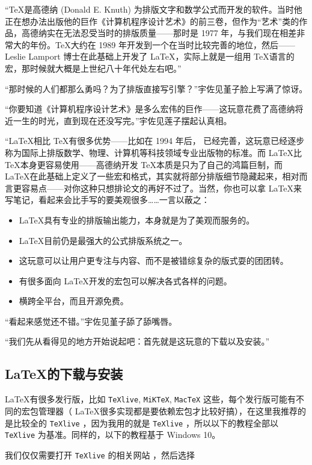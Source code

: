 “\TeX 是高德纳 (Donald E. Knuth) 为排版文字和数学公式而开发的软件。当时他正在想办法出版他的巨作《计算机程序设计艺术》的前三卷，但作为“艺术”类的作品，高德纳实在无法忍受当时的排版质量——那时是 1977 年，与我们现在相差非常大的年份。\TeX 大约在 1989 年开发到一个在当时比较完善的地位，然后—— Leslie Lamport 博士在此基础上开发了 \LaTeX，实际上就是一组用 \TeX 语言的宏，那时候就大概是上世纪八十年代处左右吧。”

“那时候的人们都那么勇吗？为了排版直接写引擎？”宇佐见堇子脸上写满了惊讶。

“你要知道《计算机程序设计艺术》是多么宏伟的巨作——这玩意花费了高德纳将近一生的时光，直到现在还没写完。”宇佐见莲子摆起认真相。

“\LaTeX 相比 \TeX 有很多优势——比如在 1994 年后，\LaTeXe{} 已经完善，这玩意已经逐步称为国际上排版数学、物理、计算机等科技领域专业出版物的标准。而 \LaTeX 比 \TeX 本身更容易使用——高德纳开发 \TeX 本质是只为了自己的鸿篇巨制，而 \LaTeX 在此基础上定义了一些宏和格式，其实就将部分排版细节隐藏起来，相对而言更容易点——对你这种只想排论文的再好不过了。当然，你也可以拿 \LaTeX 来写笔记，看起来会比手写的要美观很多……一言以蔽之：


\begin{itemize}
    \item \LaTeX 具有专业的排版输出能力，本身就是为了美观而服务的。
    \item \LaTeX 目前仍是最强大的公式排版系统之一。
    \item 这玩意可以让用户更专注与内容、而不是被错综复杂的版式耍的团团转。
    \item 有很多面向 \LaTeX 开发的宏包可以解决各式各样的问题。
    \item 横跨全平台，而且开源免费。
\end{itemize}

“看起来感觉还不错。”宇佐见堇子舔了舔嘴唇。

“我们先从看得见的地方开始说起吧：首先就是这玩意的下载以及安装。”

\subsection{\LaTeX 的下载与安装}

\LaTeX 有很多发行版，比如 \verb"TeXlive", \verb"MiKTeX", \verb"MacTeX" 这些，每个发行版可能有不同的宏包管理器（ \LaTeX 很多实现都是要依赖宏包才比较好搞），在这里我推荐的是比较全的 \verb"TeXlive" ，因为我用的就是 \verb"TeXlive" ，所以以下的教程全部以 \verb"TeXlive" 为基准。同样的，以下的教程基于 Windows 10。

我们仅仅需要打开 \verb"TeXlive" 的相关网站 ，然后选择

